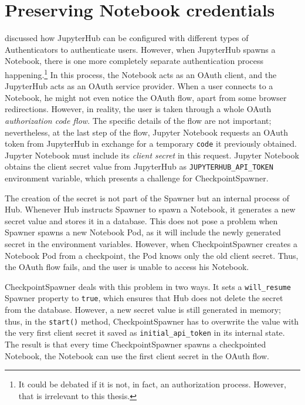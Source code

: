 \documentclass[
  digital,     %
  oneside,     %
  nosansbold,  %
  nocolorbold, %
  lof,         %
  nolot,         %
]{fithesis4}
\begin{document}
\section{Preserving Notebook credentials}
 discussed how JupyterHub can be configured with different types of Authenticators to authenticate users. However, when JupyterHub spawns a Notebook, there is one more completely separate authentication process happening.\footnote{It could be debated if it is not, in fact, an authorization process. However, that is irrelevant to this thesis.}  In this process, the Notebook acts as an OAuth client, and the JupyterHub acts as an OAuth service provider. When a user connects to a Notebook, he might not even notice the OAuth flow, apart from some browser redirections. However, in reality, the user is taken through a whole OAuth \emph{authorization code flow}. The specific details of the flow are not important; nevertheless, at the last step of the flow, Jupyter Notebook requests an OAuth token from JupyterHub in exchange for a temporary \texttt{code} it previously obtained. Jupyter Notebook must include its \emph{client secret} in this request. Jupyter Notebook obtains the client secret value from JupyterHub as \texttt{JUPYTERHUB\_API\_TOKEN} environment variable, which presents a challenge for CheckpointSpawner.

The creation of the secret is not part of the Spawner but an internal process of Hub. Whenever Hub instructs Spawner to spawn a Notebook, it generates a new secret value and stores it in a database. This does not pose a problem when Spawner spawns a new Notebook Pod, as it will include the newly generated secret in the environment variables. However, when CheckpointSpawner creates a Notebook Pod from a checkpoint, the Pod knows only the old client secret. Thus, the OAuth flow fails, and the user is unable to access his Notebook.

CheckpointSpawner deals with this problem in two ways. It sets a \texttt{will\_resume} Spawner property to \texttt{true}, which ensures that Hub does not delete the secret from the database. However, a new secret value is still generated in memory; thus, in the \texttt{start()} method, CheckpointSpawner has to overwrite the value with the very first client secret it saved as \texttt{initial\_api\_token} in its internal state. The result is that every time CheckpointSpawner spawns a checkpointed Notebook, the Notebook can use the first client secret in the OAuth flow.
\end{document}
